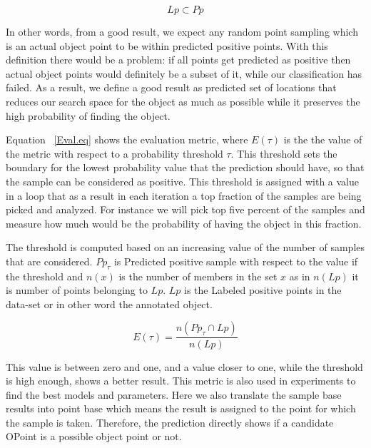 \begin{equation}
 \label{Lp-PpRelation.eq}
 Lp \subset Pp
\end{equation}

In other words, from a good result, we expect any random point sampling which is an actual object point to be within predicted 
positive points.   
With this definition there would be a problem: if all points get predicted as positive then actual object points would definitely 
be a subset of it, while our classification has failed.
As a result, we define a good result as predicted set of locations that reduces our search space for the object as much as possible 
while it preserves the high probability of finding the object.

Equation ~\ref{Eval.eq} shows the evaluation metric, where $E(\tau)$ is the the value of the metric with respect to a probability 
threshold $\tau$. 
This threshold sets the boundary for the lowest probability value that the prediction should have, so that the sample can be 
considered as positive. 
This threshold is assigned with a value in a loop that as a result in each iteration a top fraction of the samples are being picked
and analyzed. 
For instance we will pick top five percent of the samples and measure how much would be the probability of having the object in 
this fraction.

The threshold is computed based on an increasing value of the number of samples that are considered.
$Pp_{\tau}$ is Predicted positive sample with respect to the value if the threshold and $n(x)$ is the number of 
members in the set $x$ as in $n(Lp)$ it is number of points belonging to $Lp$. $Lp$ is the 
Labeled positive points in the data-set or in other word the annotated object.

\begin{equation}
 \label{Eval.eq}
    E(\tau) = \frac{n({Pp_{\tau}} \cap {Lp})}{n(Lp)} 
\end{equation}

This value is between zero and one, and a value closer to one, while the threshold is high enough, shows a better result.
This metric is also used in experiments to find the best models and parameters. 
Here we also translate the sample base results into point base which means the result is assigned to the point for which the sample
is taken.
Therefore, the prediction directly shows if a candidate OPoint is a possible object point or not.

